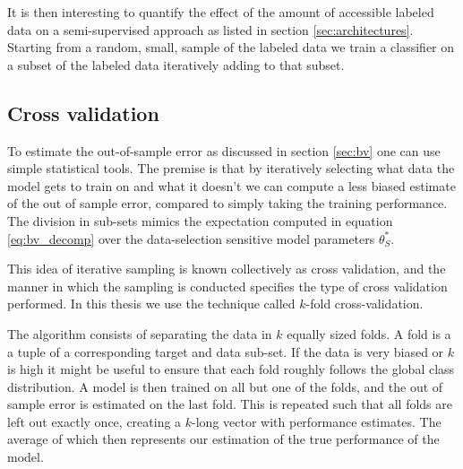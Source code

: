 It is then interesting to quantify the effect of the amount of accessible labeled data on a semi-supervised approach as listed in section \ref{sec:architectures}. Starting from a random, small, sample of the labeled data we train a classifier on a subset of the labeled data iteratively adding to that subset. 


\subsection{Cross validation}\label{sec:cv}

To estimate the out-of-sample error as discussed in section \ref{sec:bv} one can use simple statistical tools. The premise is that by iteratively selecting what data the model gets to train on and what it doesn't we can compute a less biased estimate of the out of sample error, compared to simply taking the training performance. The division in sub-sets mimics the expectation computed in equation \ref{eq:bv_decomp} over the data-selection sensitive model parameters $\theta_S^*$. 

This idea of iterative sampling is known collectively as cross validation, and the manner in which the sampling is conducted specifies the type of cross validation performed. In this thesis we use the technique called $k$-fold cross-validation. 

The algorithm consists of separating the data in $k$ equally sized folds. A fold is a a tuple of a corresponding target and data sub-set. If the data is very biased or $k$ is high it might be useful to ensure that each fold roughly follows the global class distribution. A model is then trained on all but one of the folds, and the out of sample error is estimated on the last fold. This is repeated such that all folds are left out exactly once, creating a $k$-long vector with performance estimates. The average of which then represents our estimation of the true performance of the model.
